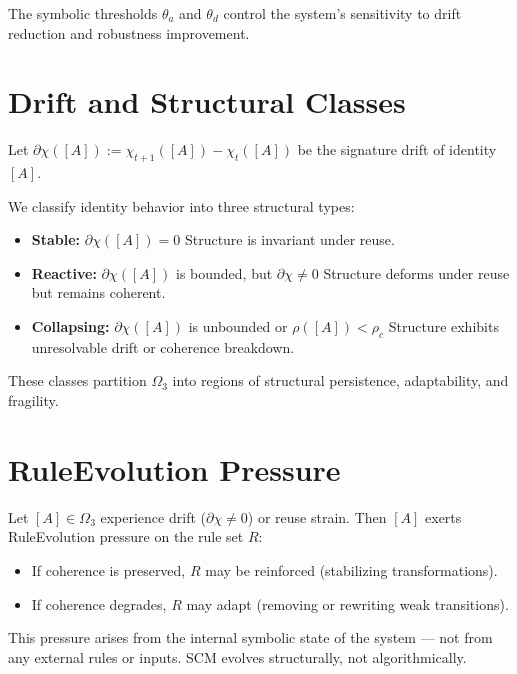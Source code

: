The symbolic thresholds $\theta_a$ and $\theta_d$ control the system’s sensitivity to drift reduction and robustness improvement.

\section{Drift and Structural Classes} \label{drift-and-structural-classes}

Let $\partial \chi([A]) := \chi_{t+1}([A]) - \chi_t([A])$ be the signature drift of identity $[A]$.

We classify identity behavior into three structural types:

\begin{itemize}
  \item \textbf{Stable:} $\partial \chi([A]) = 0$  
  Structure is invariant under reuse.

  \item \textbf{Reactive:} $\partial \chi([A])$ is bounded, but $\partial \chi \ne 0$  
  Structure deforms under reuse but remains coherent.

  \item \textbf{Collapsing:} $\partial \chi([A])$ is unbounded or $\rho([A]) < \rho_c$  
  Structure exhibits unresolvable drift or coherence breakdown.
\end{itemize}

These classes partition $\Omega_3$ into regions of structural persistence, adaptability, and fragility.

\section{RuleEvolution Pressure} \label{ruleevolution-pressure}

Let $[A] \in \Omega_3$ experience drift ($\partial \chi \ne 0$) or reuse strain.  
Then $[A]$ exerts RuleEvolution pressure on the rule set $R$:

\begin{itemize}
  \item If coherence is preserved, $R$ may be reinforced (stabilizing transformations).
  \item If coherence degrades, $R$ may adapt (removing or rewriting weak transitions).
\end{itemize}

This pressure arises from the internal symbolic state of the system — not from any external rules or inputs.  
SCM evolves structurally, not algorithmically.

